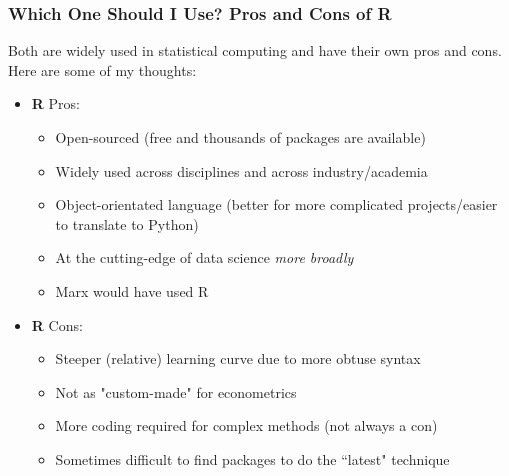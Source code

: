 \documentclass{beamer}
\begin{document}
\begin{frame}
    \frametitle{Which One Should I Use? Pros and Cons of R}

    Both are widely used in statistical computing and have their own pros and cons. Here are some of my thoughts:

    \begin{itemize}
        \item \textbf{R} Pros:
        \begin{itemize}
            \item Open-sourced (free and thousands of packages are available)
            \item Widely used across disciplines and across industry/academia
            \item Object-orientated language (better for more complicated projects/easier to translate to Python)
            \item At the cutting-edge of data science \emph{more broadly}
            \item Marx would have used R
        \end{itemize}
        \item \textbf{R} Cons:
        \begin{itemize}
            \item Steeper (relative) learning curve due to more obtuse syntax
            \item Not as "custom-made" for econometrics
            \item More coding required for complex methods (not always a con)
            \item Sometimes difficult to find packages to do the ``latest" technique
        \end{itemize}
    \end{itemize}

\end{frame}
\end{document}
